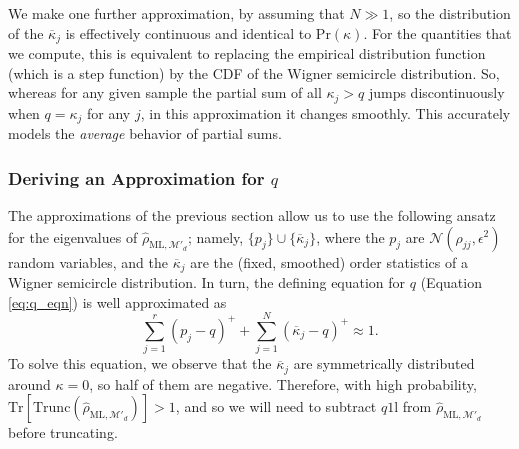 \documentclass[aps,pra, twocolumn]{revtex4-1}
\newcommand{\M}{\mathcal{M}}
\newcommand{\Tr}{\mathrm{Tr}}
\newcommand{\Id}{\mathbb{I}}
\def\Id{1\!\mathrm{l}}
\newcommand{\rhohat}{\hat{\rho}}
\newcommand{\rhoML}[1]{\rhohat_{\scriptscriptstyle{\mathrm{ML},#1}}}
\begin{document}
We make one further approximation, by assuming that $N\gg1$, so the distribution of the $\overline{\kappa}_j$ is effectively continuous and identical to $\mathrm{Pr}(\kappa)$. For the quantities that we compute, this is equivalent to replacing the empirical distribution function (which is a step function) by the CDF of the Wigner semicircle distribution.  So, whereas for any given sample the partial sum of all $\kappa_j > q$ jumps discontinuously when $q=\kappa_j$ for any $j$, in this approximation it changes smoothly.  This accurately models the \emph{average} behavior of partial sums.

\subsubsection{Deriving an Approximation for $q$}
The approximations of the previous section allow us to use the following ansatz for the eigenvalues of $\rhoML{\M'_{d}}$; namely, $\{p_j\} \cup \{\overline{\kappa}_j\}$, where the $p_j$ are $\mathcal{N}(\rho_{jj},\epsilon^2)$ random variables, and the $\overline{\kappa}_j$ are the (fixed, smoothed) order statistics of a Wigner semicircle distribution.  In turn, the defining equation for $q$ (Equation \eqref{eq:q_eqn}) is well approximated as
\begin{equation}
\sum_{j=1}^{r}(p_j - q)^{+} + \sum_{j=1}^{N}{(\overline{\kappa}_j-q)^+} \approx 1.
\end{equation}
To solve this equation, we observe that the $\overline{\kappa}_j$ are symmetrically distributed around $
\kappa=0$, so half of them are negative.  Therefore, with high probability, $\Tr
\left[\mathrm{Trunc}(\rhoML{\M'_{d}})\right]>1$, and so we will need to subtract $q\Id$ from $\rhoML{\M'_{d}}$ before truncating.
\end{document}
